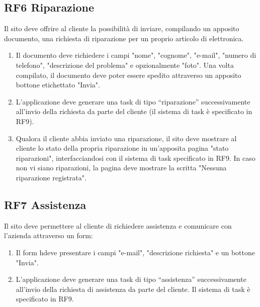 \documentclass{report}
\begin{document}
\subsection*{RF6 Riparazione}

Il sito deve offrire al cliente la possibilità di inviare, compilando un apposito documento, una richiesta di riparazione per un proprio articolo di elettronica.
\begin{enumerate}


	\item Il documento deve richiedere i campi "nome", "cognome", "e-mail", "numero di telefono", "descrizione del problema" e opzionalmente "foto". Una volta compilato, il documento deve poter essere spedito attraverso un apposito bottone etichettato "Invia".
	
	\item L’applicazione deve generare una task di tipo “riparazione” successivamente all’invio della richiesta da parte del cliente (il sistema di task è specificato in RF9).
	
	\item Qualora il cliente abbia inviato una riparazione, il sito deve mostrare al cliente lo stato della propria riparazione in un'apposita pagina "stato riparazioni", interfacciandosi con il sistema di task specificato in RF9. In caso non vi siano riparazioni, la pagina deve mostrare la scritta "Nessuna riparazione registrata".
	
\end{enumerate}

\subsection*{RF7 Assistenza}
Il sito deve permettere al cliente di richiedere assistenza e comunicare con l'azienda attraverso un form:

\begin{enumerate}
	\item Il form hdeve presentare i campi "e-mail", "descrizione richiesta" e un bottone "Invia".
	
	\item L’applicazione deve generare una task di tipo “assistenza” successivamente all’invio della richiesta di assistenza da parte del cliente. Il sistema di task è specificato in RF9.
	
	
\end{enumerate}
\end{document}
